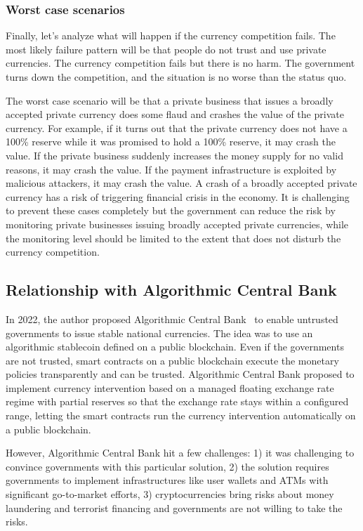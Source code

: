 \documentclass[dvipdfmx,a4paper]{article}
\begin{document}
\subsubsection{Worst case scenarios}

Finally, let's analyze what will happen if the currency competition fails. The most likely failure pattern will be that people do not trust and use private currencies. The currency competition fails but there is no harm. The government turns down the competition, and the situation is no worse than the status quo.

The worst case scenario will be that a private business that issues a broadly accepted private currency does some flaud and crashes the value of the private currency. For example, if it turns out that the private currency does not have a 100\% reserve while it was promised to hold a 100\% reserve, it may crash the value. If the private business suddenly increases the money supply for no valid reasons, it may crash the value. If the payment infrastructure is exploited by malicious attackers, it may crash the value. A crash of a broadly accepted private currency has a risk of triggering financial crisis in the economy. It is challenging to prevent these cases completely but the government can reduce the risk by monitoring private businesses issuing broadly accepted private currencies, while the monitoring level should be limited to the extent that does not disturb the currency competition.

\subsection{Relationship with Algorithmic Central Bank}

In 2022, the author proposed Algorithmic Central Bank~\cite{hara2021johnlawcoin,hara2021acb} to enable untrusted governments to issue stable national currencies. The idea was to use an algorithmic stablecoin defined on a public blockchain. Even if the governments are not trusted, smart contracts on a public blockchain execute the monetary policies transparently and can be trusted. Algorithmic Central Bank proposed to implement currency intervention based on a managed floating exchange rate regime with partial reserves so that the exchange rate stays within a configured range, letting the smart contracts run the currency intervention automatically on a public blockchain.

However, Algorithmic Central Bank hit a few challenges: 1) it was challenging to convince governments with this particular solution, 2) the solution requires governments to implement infrastructures like user wallets and ATMs with significant go-to-market efforts, 3) cryptocurrencies bring risks about money laundering and terrorist financing and governments are not willing to take the risks.
\end{document}
